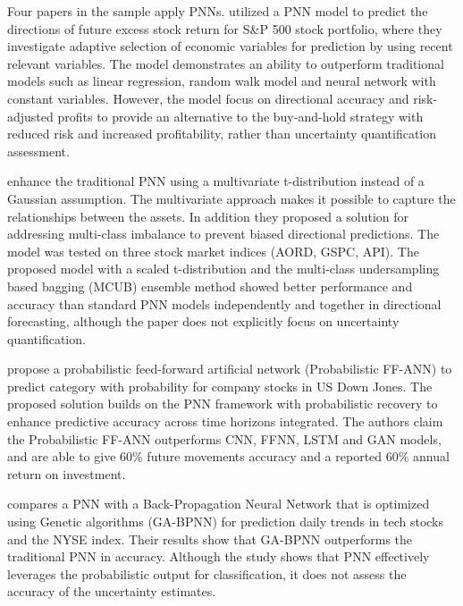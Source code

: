 Four papers in the sample apply PNNs.
\textcite{Thawornwong2004pnn} utilized a PNN model to predict the directions of future
excess stock return for S\&P 500 stock portfolio, where they investigate adaptive selection of economic variables for prediction by using recent relevant variables. The model demonstrates an ability to outperform traditional models such as linear regression, random walk model and neural network with constant variables. However, the model focus on directional accuracy and risk-adjusted profits to provide an alternative to the buy-and-hold strategy with reduced risk and increased profitability, rather than uncertainty quantification assessment.  

\textcite{Chandrasekara2019pnn} enhance the traditional PNN using a multivariate t-distribution instead of a Gaussian assumption. The multivariate approach makes it possible to capture the relationships between the assets. In addition they proposed a solution for addressing multi-class imbalance to prevent biased directional predictions. The model was tested on three stock market indices (AORD, GSPC, API). The proposed model with a scaled t-distribution and the multi-class undersampling based bagging (MCUB) ensemble method showed better performance and accuracy than standard PNN models independently and together in directional forecasting, although the paper does not explicitly focus on uncertainty quantification.  

\textcite{Maniatopoulos2022pnn} propose a probabilistic feed-forward artificial network (Probabilistic FF-ANN) to predict category with probability for company stocks in US Down Jones. The proposed solution builds on the PNN framework with probabilistic recovery to enhance predictive accuracy across time horizons integrated. The authors claim the Probabilistic FF-ANN outperforms CNN, FFNN, LSTM and GAN models, and are able to give 60\% future movements accuracy and a reported 60\% annual return on investment. 

\textcite{Lahmiri2024pnn} compares a PNN with a Back-Propagation Neural Network that is optimized using Genetic algorithms (GA-BPNN) for prediction daily trends in tech stocks and the NYSE index. Their results show that GA-BPNN outperforms the traditional PNN in accuracy. Although the study shows that PNN effectively leverages the probabilistic output for classification, it does not assess the accuracy of the uncertainty estimates.


